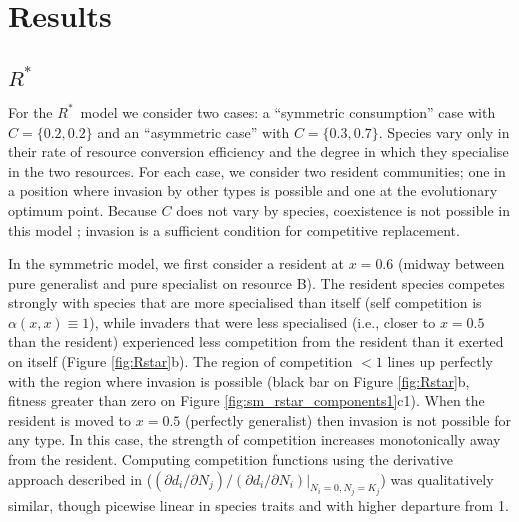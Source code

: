\documentclass[a4paper,11pt]{article}
\newcommand{\Rstar}{\ensuremath{R^*}}
\begin{document}

\clearpage

\section{Results}

%

\subsection{\Rstar}

For the \Rstar\ model we consider two cases: a ``symmetric
consumption'' case with $C = \{0.2, 0.2\}$ and an ``asymmetric case''
with $C = \{0.3, 0.7\}$.  Species vary only in their rate of resource
conversion efficiency and the degree in which they specialise in the
two resources.  For each case, we consider two resident communities;
one in a position where invasion by other types is possible and one at
the evolutionary optimum point.
%
Because $C$ does not vary by species, coexistence is not possible in
this model \citep{Tilman-1982}; invasion is a sufficient condition for
competitive replacement.

In the symmetric model, we first consider a resident at $x = 0.6$
(midway between pure generalist and pure specialist on resource B).
%
The resident species competes strongly with species that are more
specialised than itself (self competition is $\alpha(x, x) \equiv
1$), while invaders that were less specialised (i.e., closer to $x =
0.5$ than the resident) experienced less competition from the resident
than it exerted on itself (Figure \ref{fig:Rstar}b).
%
The region of competition $< 1$ lines up perfectly with the region
where invasion is possible (black bar on Figure \ref{fig:Rstar}b,
fitness greater than zero on Figure
\ref{fig:sm_rstar_components1}c1).
%
When the resident is moved to $x = 0.5$ (perfectly generalist) then
invasion is not possible for any type.  In this case, the strength of
competition increases monotonically away from the resident.
%
Computing competition functions using the derivative approach
described in \citet{Abrams-2008}
($(\partial d_i / \partial N_j) / (\partial d_i / \partial N_i) |_{N_i
  = 0, N_j = K_j}$)
was qualitatively similar, though picewise linear in species traits
and with higher departure from 1.
\end{document}

